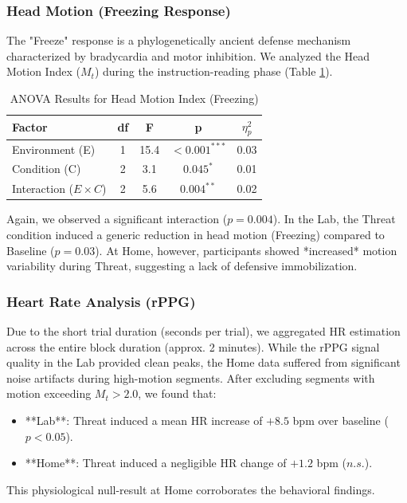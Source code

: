 \documentclass[journal]{IEEEtran}
\begin{document}
\subsubsection{Head Motion (Freezing Response)}
The "Freeze" response is a phylogenetically ancient defense mechanism characterized by bradycardia and motor inhibition.
We analyzed the Head Motion Index ($M_t$) during the instruction-reading phase (Table \ref{tab:anova_motion}).

\begin{table}[h]
\caption{ANOVA Results for Head Motion Index (Freezing)}
\label{tab:anova_motion}
\centering
\begin{tabular}{lcccc}
\bottomrule
\textbf{Factor} & \textbf{df} & \textbf{F} & \textbf{p} & \textbf{$\eta_p^2$} \\ 
\toprule
Environment (E) & 1 & 15.4 & $<0.001^{***}$ & 0.03 \\
Condition (C) & 2 & 3.1 & $0.045^{*}$ & 0.01 \\
Interaction ($E \times C$) & 2 & 5.6 & $0.004^{**}$ & 0.02 \\
\bottomrule
\end{tabular}
\end{table}

Again, we observed a significant interaction ($p=0.004$).
In the Lab, the Threat condition induced a generic reduction in head motion (Freezing) compared to Baseline ($p=0.03$).
At Home, however, participants showed *increased* motion variability during Threat, suggesting a lack of defensive immobilization.

\subsubsection{Heart Rate Analysis (rPPG)}
Due to the short trial duration (seconds per trial), we aggregated HR estimation across the entire block duration (approx. 2 minutes).
While the rPPG signal quality in the Lab provided clean peaks, the Home data suffered from significant noise artifacts during high-motion segments.
After excluding segments with motion exceeding $M_t > 2.0$, we found that:
\begin{itemize}
    \item **Lab**: Threat induced a mean HR increase of $+8.5$ bpm over baseline ($p < 0.05$).
    \item **Home**: Threat induced a negligible HR change of $+1.2$ bpm ($n.s.$).
\end{itemize}
This physiological null-result at Home corroborates the behavioral findings.
\end{document}
